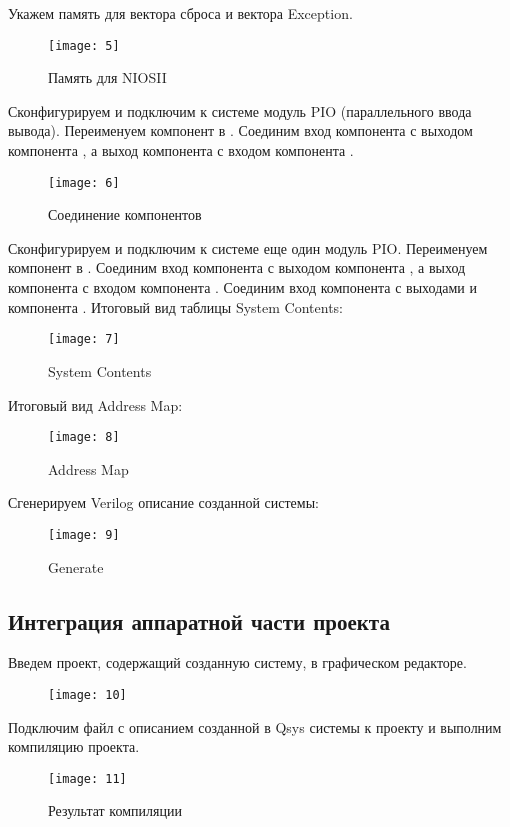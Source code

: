 Укажем память для вектора сброса и вектора Exception.
\begin{figure}[H]
	\centering
	\texttt{[image: 5]}
	\caption{Память для NIOSII}
\end{figure}

Сконфигурируем и подключим к системе модуль PIO (параллельного ввода вывода). Переименуем компонент в . Соединим вход  компонента  с выходом  компонента , а выход  компонента  с входом  компонента .
\begin{figure}[H]
	\centering
	\texttt{[image: 6]}
	\caption{Соединение компонентов}
\end{figure}

Сконфигурируем и подключим к системе еще один модуль PIO. Переименуем компонент в . Соединим вход  компонента  с выходом  компонента , а выход  компонента  с входом  компонента . Соединим вход  компонента  с выходами  и  компонента . Итоговый вид таблицы System Contents:
\begin{figure}[H]
	\centering
	\texttt{[image: 7]}
	\caption{System Contents}
\end{figure}

Итоговый вид Address Map:
\begin{figure}[H]
	\centering
	\texttt{[image: 8]}
	\caption{Address Map}
\end{figure}

Сгенерируем Verilog описание созданной системы:
\begin{figure}[H]
	\centering
	\texttt{[image: 9]}
	\caption{Generate}
\end{figure}

\subsection{Интеграция аппаратной части проекта}

Введем проект, содержащий созданную систему, в графическом редакторе.
\begin{figure}[H]
	\centering
	\texttt{[image: 10]}
	\caption{}
\end{figure}

Подключим файл с описанием созданной в Qsys системы к проекту и выполним компиляцию проекта.
\begin{figure}[H]
	\centering
	\texttt{[image: 11]}
	\caption{Результат компиляции}
\end{figure}

